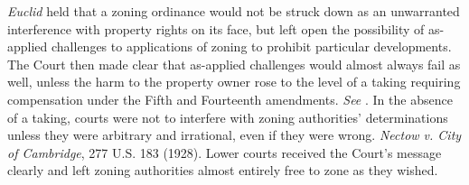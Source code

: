 

\textit{Euclid} held that a zoning ordinance would not be struck down as an
unwarranted interference with property rights on its face, but left open the
possibility of as-applied challenges to applications of zoning to prohibit
particular developments. The Court then made clear that as-applied challenges
would almost always fail as well, unless the harm to the property owner rose to
the level of a taking requiring compensation under the Fifth and Fourteenth
amendments. \textit{See} . In the absence of a taking, courts were not to interfere with zoning
authorities' determinations unless they were arbitrary and irrational, even if
they were wrong. \emph{Nectow v. City of Cambridge}, 277 U.S. 183 (1928). Lower
courts received the Court's message clearly and left zoning authorities almost
entirely free to zone as they wished.

